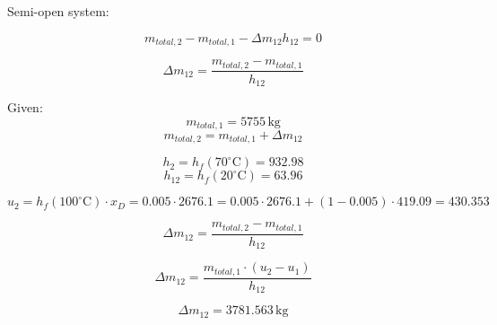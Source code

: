 Semi-open system:  

\[ m_{total,2} - m_{total,1} - \Delta m_{12} h_{12} = 0 \]  

\[ \Delta m_{12} = \frac{m_{total,2} - m_{total,1}}{h_{12}} \]  

Given:  
\[ m_{total,1} = 5755 \, \text{kg} \]  
\[ m_{total,2} = m_{total,1} + \Delta m_{12} \]  

\[ h_{2} = h_{f}(70^\circ \text{C}) = 932.98 \]  
\[ h_{12} = h_{f}(20^\circ \text{C}) = 63.96 \]  

\[ u_{2} = h_{f}(100^\circ \text{C}) \cdot x_D = 0.005 \cdot 2676.1 = 0.005 \cdot 2676.1 + (1 - 0.005) \cdot 419.09 = 430.353 \]  

\[ \Delta m_{12} = \frac{m_{total,2} - m_{total,1}}{h_{12}} \]  

\[ \Delta m_{12} = \frac{m_{total,1} \cdot (u_{2} - u_{1})}{h_{12}} \]  

\[ \Delta m_{12} = 3781.563 \, \text{kg} \]